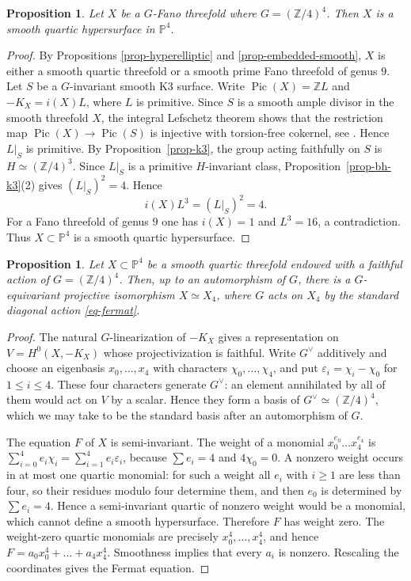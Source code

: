 \documentclass[10pt,oneside,reqno]{amsart}
\numberwithin{equation}{section}
\newtheorem{proposition}[theorem]{Proposition}
\theoremstyle{definition}
\newcommand{\Z}{\mathbb Z}
\newcommand{\PP}{\mathbb P}
\newcommand{\Pic}{\operatorname{Pic}}
\begin{document}
\begin{proposition}
\label{prop-smooth-quartic}
Let $X$ be a $G$-Fano threefold where $G=(\mathbb{Z}/4)^4$. 
Then $X$ is a smooth quartic hypersurface in $\PP^4$.
\end{proposition}

\begin{proof}
By Propositions \ref{prop-hyperelliptic} and
\ref{prop-embedded-smooth}, $X$ is either a smooth quartic threefold or
a smooth prime Fano threefold of genus $9$.  
Let $S$ be a $G$-invariant smooth K3 surface. 
Write $\Pic(X)=\Z L$ and
$-K_X=i(X)L$, where $L$ is primitive.  Since $S$ is a smooth ample
divisor in the smooth threefold $X$, the integral Lefschetz theorem
shows that the restriction map $\Pic(X)\to\Pic(S)$ is injective with
torsion-free cokernel, see
\cite[Corollary~2.3.4]{BeltramettiSommese}.  Hence $L|_S$ is
primitive.
By Proposition~\ref{prop-k3}, the group acting faithfully on $S$ is
$H\simeq(\Z/4)^3$.  Since $L|_S$ is a primitive $H$-invariant class,
Proposition~\ref{prop-bh-k3}(2) gives $(L|_S)^2=4$.  Hence
\[
 i(X)L^3=(L|_S)^2=4.
\]
For a Fano threefold of genus $9$ one has $i(X)=1$ and $L^3=16$, a
contradiction.  Thus $X\subset\PP^4$ is a smooth quartic hypersurface.
\end{proof}

\begin{proposition}
\label{prop-fermat}
Let $X\subset\PP^4$ be a smooth quartic threefold endowed with a
faithful action of $G=(\Z/4)^4$.  Then, up to an automorphism of $G$,
there is a $G$-equivariant projective isomorphism $X\simeq X_4$, where
$G$ acts on $X_4$ by the standard diagonal action \eqref{eq-fermat}.
\end{proposition}

\begin{proof}
The natural $G$-linearization of $-K_X$ gives a representation on
$V=H^0(X,-K_X)$ whose projectivization is faithful.  Write $G^\vee$
additively and choose an eigenbasis
$x_0,\ldots,x_4$ with characters $\chi_0,\ldots,\chi_4$, and put
$\varepsilon_i=\chi_i-\chi_0$ for $1\leq i\leq4$.  These four
characters generate $G^\vee$: an element annihilated by all of them
would act on $V$ by a scalar.  Hence they form a basis of
$G^\vee\simeq(\Z/4)^4$, which we may take to be the standard basis
after an automorphism of $G$.

The equation  $F$ of $X$ is semi-invariant.  The weight of a monomial
$x_0^{e_0}\ldots x_4^{e_4}$ is
$\sum_{i=0}^4e_i\chi_i=\sum_{i=1}^4e_i\varepsilon_i$, because
$\sum e_i=4$ and $4\chi_0=0$.  A nonzero weight occurs in at most one
quartic monomial: for such a weight all $e_i$ with $i\geq1$ are less
than four, so their residues modulo four determine them, and then
$e_0$ is determined by $\sum e_i=4$.  Hence a
semi-invariant quartic of nonzero weight would be a monomial, which
cannot define a smooth hypersurface.  Therefore $F$ has weight zero.
The weight-zero quartic monomials are precisely
$x_0^4,\ldots,x_4^4$, and hence
$F=a_0x_0^4+\ldots+a_4x_4^4$.  Smoothness implies that every $a_i$ is
nonzero.  Rescaling the coordinates gives the Fermat equation.
\end{proof}
\end{document}
